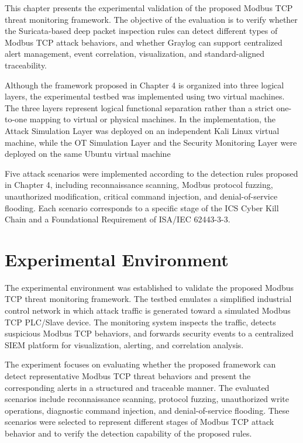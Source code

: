 \noindent

This chapter presents the experimental validation of the proposed Modbus TCP threat monitoring framework. The objective of the evaluation is to verify whether the Suricata-based deep packet inspection rules can detect different types of Modbus TCP attack behaviors, and whether Graylog can support centralized alert management, event correlation, visualization, and standard-aligned traceability.

Although the framework proposed in Chapter 4 is organized into three logical layers, the experimental testbed was implemented using two virtual machines. The three layers represent logical functional separation rather than a strict one-to-one mapping to virtual or physical machines. In the implementation, the Attack Simulation Layer was deployed on an independent Kali Linux virtual machine, while the OT Simulation Layer and the Security Monitoring Layer were deployed on the same Ubuntu virtual machine

Five attack scenarios were implemented according to the detection rules proposed in Chapter 4, including reconnaissance scanning, Modbus protocol fuzzing, unauthorized modification, critical command injection, and denial-of-service flooding. Each scenario corresponds to a specific stage of the ICS Cyber Kill Chain and a Foundational Requirement of ISA/IEC 62443-3-3.

\section{Experimental Environment}
The experimental environment was established to validate the proposed Modbus TCP threat monitoring framework. The testbed emulates a simplified industrial control network in which attack traffic is generated toward a simulated Modbus TCP PLC/Slave device. The monitoring system inspects the traffic, detects suspicious Modbus TCP behaviors, and forwards security events to a centralized SIEM platform for visualization, alerting, and correlation analysis.

The experiment focuses on evaluating whether the proposed framework can detect representative Modbus TCP threat behaviors and present the corresponding alerts in a structured and traceable manner. The evaluated scenarios include reconnaissance scanning, protocol fuzzing, unauthorized write operations, diagnostic command injection, and denial-of-service flooding. These scenarios were selected to represent different stages of Modbus TCP attack behavior and to verify the detection capability of the proposed rules.

